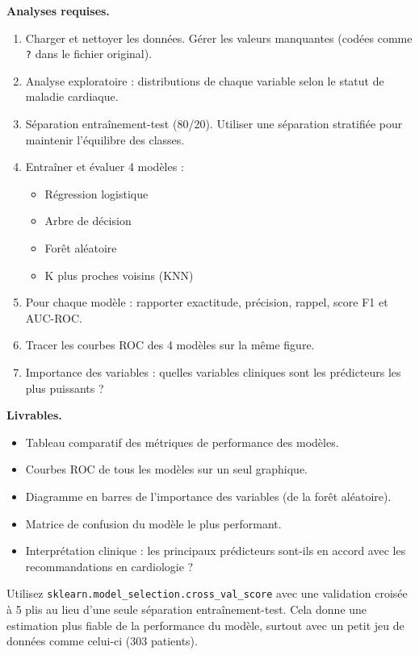 \textbf{Analyses requises.}
\begin{enumerate}
  \item Charger et nettoyer les donn\'ees. G\'erer les valeurs manquantes (cod\'ees comme \texttt{?} dans le fichier original).
  \item Analyse exploratoire : distributions de chaque variable selon le statut de maladie cardiaque.
  \item S\'eparation entra\^inement-test (80/20). Utiliser une s\'eparation stratifi\'ee pour maintenir l'\'equilibre des classes.
  \item Entra\^iner et \'evaluer 4 mod\`eles :
  \begin{itemize}
    \item R\'egression logistique
    \item Arbre de d\'ecision
    \item For\^et al\'eatoire
    \item K plus proches voisins (KNN)
  \end{itemize}
  \item Pour chaque mod\`ele : rapporter exactitude, pr\'ecision, rappel, score F1 et AUC-ROC.
  \item Tracer les courbes ROC des 4 mod\`eles sur la m\^eme figure.
  \item Importance des variables : quelles variables cliniques sont les pr\'edicteurs les plus puissants ?
\end{enumerate}

\textbf{Livrables.}
\begin{itemize}
  \item Tableau comparatif des m\'etriques de performance des mod\`eles.
  \item Courbes ROC de tous les mod\`eles sur un seul graphique.
  \item Diagramme en barres de l'importance des variables (de la for\^et al\'eatoire).
  \item Matrice de confusion du mod\`ele le plus performant.
  \item Interpr\'etation clinique : les principaux pr\'edicteurs sont-ils en accord avec les recommandations en cardiologie ?
\end{itemize}

\begin{pythontip}
Utilisez \texttt{sklearn.model\_selection.cross\_val\_score} avec une validation crois\'ee \`a 5 plis au lieu d'une seule s\'eparation entra\^inement-test. Cela donne une estimation plus fiable de la performance du mod\`ele, surtout avec un petit jeu de donn\'ees comme celui-ci (303 patients).
\end{pythontip}

